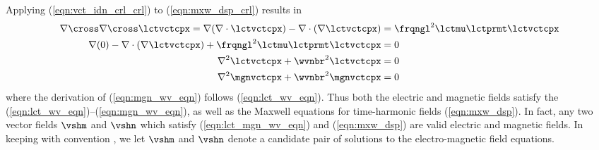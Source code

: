 \documentclass[12pt]{article}
\begin{document}
Applying (\ref{eqn:vct_idn_crl_crl}) to (\ref{eqn:mxw_dsp_crl})
results in 
\begin{subequations}
\label{eqn:lct_mgn_wv_eqn}
\begin{align}
\label{eqn:lct_wv_eqn}
\nabla \cross \nabla \cross \lctvctcpx 
= \nabla (\nabla \cdot \lctvctcpx) - \nabla \cdot (\nabla
\lctvctcpx) & = \frqngl^{2} \lctmu \lctprmt \lctvctcpx \nonumber \\
\nabla (0) - \nabla \cdot (\nabla \lctvctcpx) +  
\frqngl^{2} \lctmu \lctprmt \lctvctcpx & = 0 \nonumber \\
\nabla^{2} \lctvctcpx + \wvnbr^{2} \lctvctcpx & = 0 \\
\label{eqn:mgn_wv_eqn}
\nabla^{2} \mgnvctcpx + \wvnbr^{2} \mgnvctcpx & = 0
\end{align}
\end{subequations} 
where the derivation of (\ref{eqn:mgn_wv_eqn}) follows
(\ref{eqn:lct_wv_eqn}). 
Thus both the electric and magnetic fields satisfy the  (\ref{eqn:lct_wv_eqn})--(\ref{eqn:mgn_wv_eqn}), as well
as the Maxwell equations for time-harmonic fields (\ref{eqn:mxw_dsp}).
In fact, any two vector fields $\vshm$ and $\vshn$ which satisfy 
(\ref{eqn:lct_mgn_wv_eqn}) and (\ref{eqn:mxw_dsp}) are valid electric
and magnetic fields.
In keeping with convention \cite[][]{BoH83}, we let $\vshm$ and
$\vshn$ denote a candidate pair of solutions to the electro-magnetic
field equations.
\end{document}
